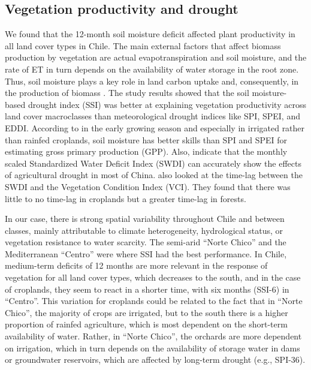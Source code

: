\documentclass[
  authoryear,
  preprint,
  3p,
  onecolumn]{elsarticle}
\begin{document}
\subsection{Vegetation productivity and
drought}\label{vegetation-productivity-and-drought}

We found that the 12-month soil moisture deficit affected plant
productivity in all land cover types in Chile. The main external factors
that affect biomass production by vegetation are actual
evapotranspiration and soil moisture, and the rate of ET in turn depends
on the availability of water storage in the root zone. Thus, soil
moisture plays a key role in land carbon uptake and, consequently, in
the production of biomass \citep{Humphrey2021}. The study results showed
that the soil moisture-based drought index (SSI) was better at
explaining vegetation productivity across land cover macroclasses than
meteorological drought indices like SPI, SPEI, and EDDI. According to
\citep{Chatterjee2022} in the early growing season and especially in
irrigated rather than rainfed croplands, soil moisture has better skills
than SPI and SPEI for estimating gross primary production (GPP). Also,
\citet{Zhou2021} indicate that the monthly scaled Standardized Water
Deficit Index (SWDI) can accurately show the effects of agricultural
drought in most of China. \citet{Nicolai2017} also looked at the
time-lag between the SWDI and the Vegetation Condition Index (VCI). They
found that there was little to no time-lag in croplands but a greater
time-lag in forests.

In our case, there is strong spatial variability throughout Chile and
between classes, mainly attributable to climate heterogeneity,
hydrological status, or vegetation resistance to water scarcity. The
semi-arid ``Norte Chico'' and the Mediterranean ``Centro'' were where
SSI had the best performance. In Chile, medium-term deficits of 12
months are more relevant in the response of vegetation for all land
cover types, which decreases to the south, and in the case of croplands,
they seem to react in a shorter time, with six months (SSI-6) in
``Centro''. This variation for croplands could be related to the fact
that in ``Norte Chico'', the majority of crops are irrigated, but to the
south there is a higher proportion of rainfed agriculture, which is most
dependent on the short-term availability of water. Rather, in ``Norte
Chico'', the orchards are more dependent on irrigation, which in turn
depends on the availability of storage water in dams or groundwater
reservoirs, which are affected by long-term drought (e.g., SPI-36).
\end{document}

